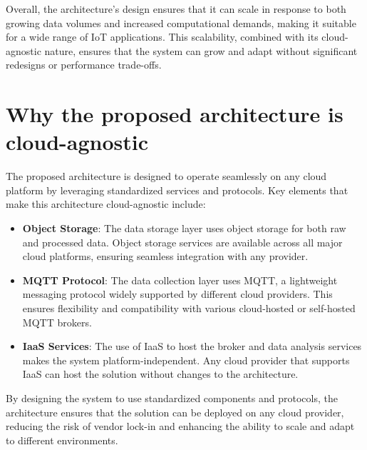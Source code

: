Overall, the architecture’s design ensures that it can scale in response to both growing data volumes and increased computational demands, making it suitable for a wide range of IoT applications. This scalability, combined with its cloud-agnostic nature, ensures that the system can grow and adapt without significant redesigns or performance trade-offs.


\section{Why the proposed architecture is cloud-agnostic}

The proposed architecture is designed to operate seamlessly on any cloud platform by leveraging standardized services and protocols. Key elements that make this architecture cloud-agnostic include:

\begin{itemize}
    \item \textbf{Object Storage}: The data storage layer uses object storage for both raw and processed data. Object storage services are available across all major cloud platforms, ensuring seamless integration with any provider.
    \item \textbf{MQTT Protocol}: The data collection layer uses MQTT, a lightweight messaging protocol widely supported by different cloud providers. This ensures flexibility and compatibility with various cloud-hosted or self-hosted MQTT brokers.
    \item \textbf{IaaS Services}: The use of IaaS to host the broker and data analysis services makes the system platform-independent. Any cloud provider that supports IaaS can host the solution without changes to the architecture.
\end{itemize}

By designing the system to use standardized components and protocols, the architecture ensures that the solution can be deployed on any cloud provider, reducing the risk of vendor lock-in and enhancing the ability to scale and adapt to different environments.
